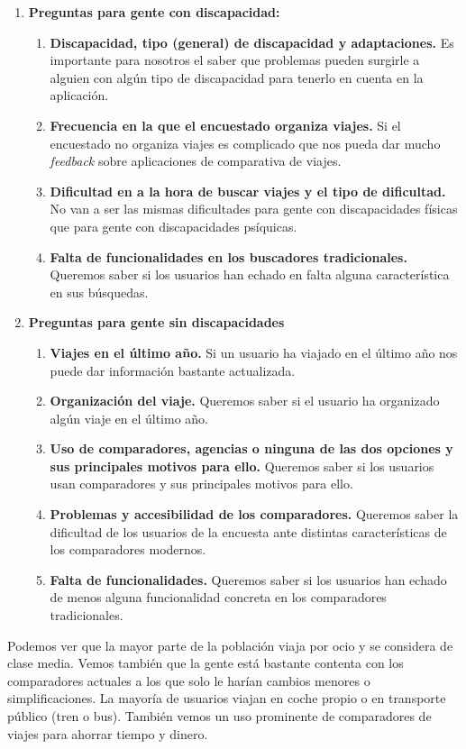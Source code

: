 \begin{enumerate}
    \item\textbf{Preguntas para gente con discapacidad:}
    \begin{enumerate}
        \item\textbf{Discapacidad, tipo (general) de discapacidad y adaptaciones.} Es importante para nosotros el saber que problemas pueden surgirle a alguien con algún tipo de discapacidad para tenerlo en cuenta en la aplicación.
    \item\textbf{Frecuencia en la que el encuestado organiza viajes.} Si el encuestado no organiza viajes es complicado que nos pueda dar mucho \textit{feedback} sobre aplicaciones de comparativa de viajes.
    \item\textbf{Dificultad en a la hora de buscar viajes y el tipo de dificultad.} No van a ser las mismas dificultades para gente con discapacidades físicas que para gente con discapacidades psíquicas.
    \item\textbf{Falta de funcionalidades en los buscadores tradicionales.} Queremos saber si los usuarios han echado en falta alguna característica en sus búsquedas.
    \end{enumerate}
    \item\textbf{Preguntas para gente sin discapacidades}
    \begin{enumerate}
        \item\textbf{Viajes en el último año.} Si un usuario ha viajado en el último año nos puede dar información bastante actualizada.
        \item\textbf{Organización del viaje.} Queremos saber si el usuario ha organizado algún viaje en el último año.
        \item\textbf{Uso de comparadores, agencias o ninguna de las dos opciones y sus principales motivos para ello.} Queremos saber si los usuarios usan comparadores y sus principales motivos para ello.
        \item\textbf{Problemas y accesibilidad de los comparadores.} Queremos saber la dificultad de los usuarios de la encuesta ante distintas características de los comparadores modernos.
        \item\textbf{Falta de funcionalidades.} Queremos saber si los usuarios han echado de menos alguna funcionalidad concreta en los comparadores tradicionales.
    \end{enumerate}
    
\end{enumerate}

Podemos ver que la mayor parte de la población viaja por ocio y se considera de clase media. Vemos también que la gente está bastante contenta con los comparadores actuales a los que solo le harían cambios menores o simplificaciones. La mayoría de usuarios viajan en coche propio o en transporte público (tren o bus). También vemos un uso prominente de comparadores de viajes para ahorrar tiempo y dinero.

